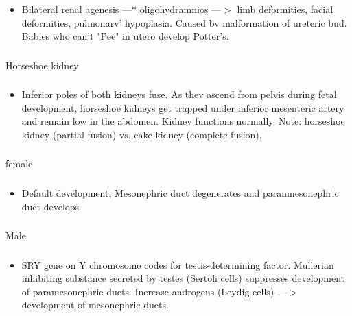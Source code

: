 \documentclass[11pt]{beamer}
\begin{document}
\begin{frame}
 \frametitle{}
\begin{itemize}
\item{Bilateral renal agenesis —* oligohydramnios —$>$ limb deformities, facial deformities, pulmonarv' hypoplasia. Caused bv malformation of ureteric bud. \\ Babies who can't "Pee" in utero develop Potter's.}
\end{itemize}
\end{frame}

\begin{frame}
 \frametitle{}
Horseshoe kidney
\end{frame}

\begin{frame}
 \frametitle{}
\begin{itemize}
\item{Inferior poles of both kidneys fuse. As thev ascend from pelvis during fetal development, horseshoe kidneys get trapped under inferior mesenteric artery and remain low in the abdomen. Kidnev functions normally. Note: horseshoe kidney (partial fusion) vs, cake kidney (complete fusion).}
\end{itemize}
\end{frame}

\begin{frame}
 \frametitle{}
female
\end{frame}

\begin{frame}
 \frametitle{}
\begin{itemize}
\item{Default development, Mesonephric duct degenerates and paranmesonephric duct develops.}
\end{itemize}
\end{frame}

\begin{frame}
 \frametitle{}
Male
\end{frame}

\begin{frame}
 \frametitle{}
\begin{itemize}
\item{SRY gene on Y chromosome codes for testis-determining factor. Mullerian inhibiting substance secreted by testes (Sertoli cells) suppresses development of paramesonephric ducts. Increase androgens (Leydig cells) —$>$ development of mesonephric ducts.}
\end{itemize}
\end{frame}
\end{document}
